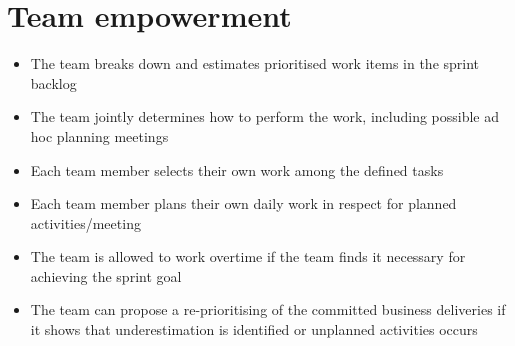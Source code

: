 \section{Team empowerment}
\begin{itemize}
    \item The team breaks down and estimates prioritised work items in the sprint backlog
    \item The team jointly determines how to perform the work, including possible ad hoc planning meetings
    \item Each team member selects their own work among the defined tasks
    \item Each team member plans their own daily work in respect for planned activities/meeting
    \item The team is allowed to work overtime if the team finds it necessary for achieving the sprint goal
    \item The team can propose a re-prioritising of the committed business deliveries if it shows that underestimation is identified or unplanned activities occurs
\end{itemize}
